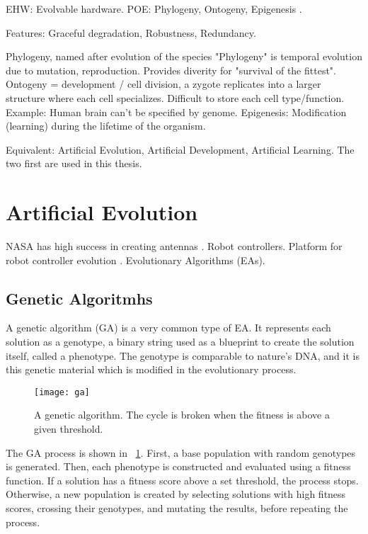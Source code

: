 \TODO
EHW: Evolvable hardware.
POE: Phylogeny, Ontogeny, Epigenesis \cite{sipper1997poe}.

Features: Graceful degradation, Robustness, Redundancy.

\TODO
Phylogeny, named after evolution of the species "Phylogeny" is temporal evolution due to mutation, reproduction.
Provides diverity for "survival of the fittest".
Ontogeny = development / cell division, a zygote replicates into a larger structure where each cell specializes.
Difficult to store each cell type/function.
Example: Human brain can't be specified by genome.
Epigenesis: Modification (learning) during the lifetime of the organism.

\TODO
Equivalent: Artificial Evolution, Artificial Development, Artificial Learning.
The two first are used in this thesis.


\section{Artificial Evolution}

\TODO
NASA has high success in creating antennas \cite{hornby2006antenna}.
Robot controllers.
Platform for robot controller evolution \cite{haddow1999robot}.
Evolutionary Algorithms (EAs).

\subsection{Genetic Algoritmhs}

A genetic algorithm (GA) is a very common type of EA.
It represents each solution as a genotype, a binary string used as a blueprint to create the solution itself, called a phenotype.
The genotype is comparable to nature's DNA, and it is this genetic material which is modified in the evolutionary process.

\begin{figure}[!ht]
    \centering
    \texttt{[image: ga]}
    \caption[Genetic Algorithm]{
        A genetic algorithm.
        The cycle is broken when the fitness is above a given threshold.
    }
    \label{fig:ga}
\end{figure}

The GA process is shown in \figurename~\ref{fig:ga}.
First, a base population with random genotypes is generated.
Then, each phenotype is constructed and evaluated using a fitness function.
If a solution has a fitness score above a set threshold, the process stops.
Otherwise, a new population is created by selecting solutions with high fitness scores, crossing their genotypes, and mutating the results, before repeating the process.

